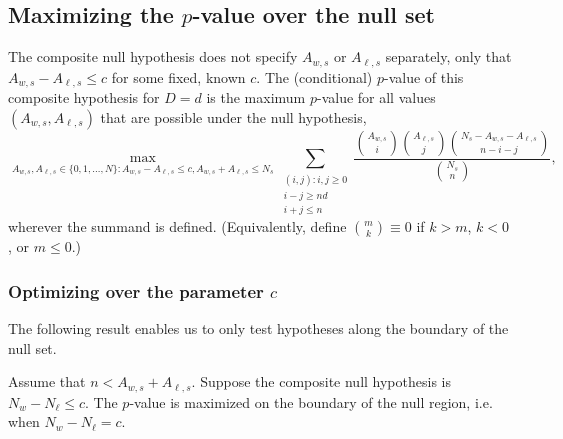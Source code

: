 \subsection{Maximizing the $p$-value over the null set}

The composite null hypothesis does not specify $A_{w,s}$ or $A_{\ell,s}$ separately, only 
that $A_{w,s} - A_{\ell,s} \le c$ for
some fixed, known $c$.
The (conditional) $p$-value of this composite hypothesis for $D=d$ is the maximum $p$-value for all
values $(A_{w,s}, A_{\ell,s})$ that are possible under the null hypothesis,
\begin{equation}
  \max_{A_{w,s}, A_{\ell,s} \in \{0, 1, \ldots, N \}: A_{w,s} - A_{\ell,s} \le c, A_{w,s} + A_{\ell,s} \le N_s}
   \sum_{\substack{(i, j) :  i, j\ge 0 \\ i-j \geq nd \\ i+j \leq n}} \frac{ {A_{w,s } \choose i}{A_{\ell,s} \choose j}{N_s - A_{w,s} - A_{\ell,s} \choose n-i-j}}{{N_s \choose n}},
\end{equation}
wherever the summand is defined. 
(Equivalently, define ${m \choose k} \equiv 0$ if $k > m$, $k < 0$, or $m \le 0$.)

\subsubsection{Optimizing over the parameter $c$}
The following result enables us to only test hypotheses along the boundary of the null set.

\begin{thm}
Assume that $n < A_{w,s}+A_{\ell,s}$.
Suppose the composite null hypothesis is $N_w - N_\ell \leq c$.
The $p$-value is maximized on the boundary of the null region, i.e. when $N_w - N_\ell = c$.
\end{thm}

